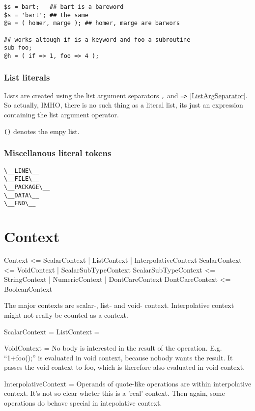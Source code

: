 \documentclass{article}
\begin{document}
\begin{verbatim}
$s = bart;   ## bart is a bareword
$s = 'bart'; ## the same
@a = ( homer, marge ); ## homer, marge are barwors

## works altough if is a keyword and foo a subroutine
sub foo; 
@h = ( if => 1, foo => 4 ); 
\end{verbatim}


\subsubsection{List literals}

Lists are created using the list argument separators \verb|,| and \verb|=>|
\ref{ListArgSeparator}. So actually, IMHO, there is no such thing as a literal
list, its just an expression containing the list argument operator.

\verb|()| denotes the empy list. 


\subsubsection{Miscellanous literal tokens}

\begin{verbatim}
\__LINE\__
\__FILE\__
\__PACKAGE\__
\__DATA\__
\__END\__
\end{verbatim}

\section{Context}
Context <= ScalarContext | ListContext | InterpolativeContext
ScalarContext <= VoidContext | ScalarSubTypeContext
ScalarSubTypeContext <= StringContext | NumericContext | DontCareContext 
DontCareContext <= BooleanContext

The major contexts are scalar-, list- and void- context. Interpolative
context might not really be counted as a context.

ScalarContext =
ListContext =

VoidContext = 
No body is interested in the result of the
operation. E.g. ``1+foo();'' is evaluated in void context, because
nobody wants the result. It passes the void context to foo, which is
therefore also evaluated in void context.

InterpolativeContext =
Operands of quote-like operations are within interpolative
context. It's not so clear wheter this is a 'real' context. Then
again, some operations do behave special in intepolative context.
\end{document}
